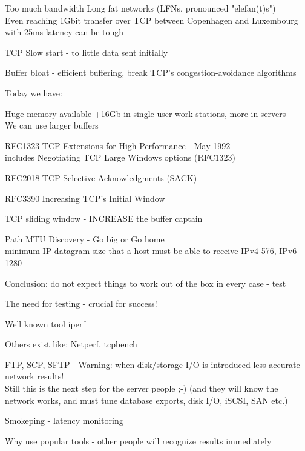 \documentclass[20pt,landscape,a4paper,footrule]{foils}
\begin{document}
\begin{list1}
\item Too much bandwidth Long fat networks (LFNs, pronounced "elefan(t)s")\\
Even reaching 1Gbit transfer over TCP between Copenhagen and Luxembourg with 25ms latency can be tough
\item TCP Slow start - to little data sent initially\\
\item Buffer bloat - efficient buffering, break TCP's congestion-avoidance algorithms\\
\end{list1}

\begin{list1}
\item Today we have:
\begin{list2}
\item Huge memory available +16Gb in single user work stations, more in servers\\
We can use larger buffers 
\item RFC1323 TCP Extensions for High Performance -  May 1992 \smiley\\
includes Negotiating TCP Large Windows options (RFC1323)
\item RFC2018 TCP Selective Acknowledgments (SACK)
\item RFC3390 Increasing TCP's Initial Window
\item TCP sliding window - INCREASE the buffer captain
\item Path MTU Discovery - Go big or Go home\\
minimum IP datagram size that a host must be able to receive IPv4 576, IPv6 1280
\end{list2}
\end{list1}
\centerline{Conclusion: do not expect things to work out of the box in every case - test}




\begin{list1}
\item The need for testing - crucial for success!
\item Well known tool iperf 
\item Others exist like: Netperf, tcpbench
\item FTP, SCP, SFTP - Warning: when disk/storage I/O is introduced less accurate network results!\\
Still this is the next step for the server people ;-)
(and they will know the network works, and must tune database exports, disk I/O, iSCSI, SAN etc.)
\item Smokeping - latency monitoring
\item Why use popular tools - other people will recognize results immediately
\end{list1}
\end{document}
